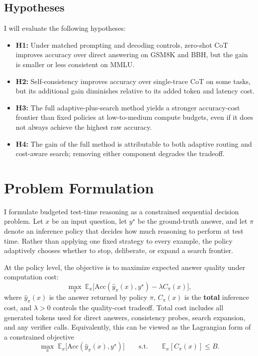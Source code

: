 \documentclass[10pt]{article}
\begin{document}
\subsection{Hypotheses}
I will evaluate the following hypotheses:
\begin{itemize}[leftmargin=1.2em,itemsep=0.10em]
    \item \textbf{H1:} Under matched prompting and decoding controls, zero-shot CoT improves accuracy over direct answering on GSM8K and BBH, but the gain is smaller or less consistent on MMLU.
    \item \textbf{H2:} Self-consistency improves accuracy over single-trace CoT on some tasks, but its additional gain diminishes relative to its added token and latency cost.
    \item \textbf{H3:} The full adaptive-plus-search method yields a stronger accuracy-cost frontier than fixed policies at low-to-medium compute budgets, even if it does not always achieve the highest raw accuracy.
    \item \textbf{H4:} The gain of the full method is attributable to both adaptive routing and cost-aware search; removing either component degrades the tradeoff.
\end{itemize}

\section{Problem Formulation}
I formulate budgeted test-time reasoning as a constrained sequential decision problem. Let $x$ be an input question, let $y^\star$ be the ground-truth answer, and let $\pi$ denote an inference policy that decides how much reasoning to perform at test time. Rather than applying one fixed strategy to every example, the policy adaptively chooses whether to stop, deliberate, or expand a search frontier.

At the policy level, the objective is to maximize expected answer quality under computation cost:
\[
\max_{\pi}\;
\mathbb{E}_{x}\Big[
\mathrm{Acc}(\hat y_\pi(x),y^\star)-\lambda C_\pi(x)
\Big],
\]
where $\hat y_\pi(x)$ is the answer returned by policy $\pi$, $C_\pi(x)$ is the \textbf{total} inference cost, and $\lambda>0$ controls the quality-cost tradeoff. Total cost includes all generated tokens used for direct answers, consistency probes, search expansion, and any verifier calls. Equivalently, this can be viewed as the Lagrangian form of a constrained objective
\[
\max_{\pi}\;\mathbb{E}_{x}\big[\mathrm{Acc}(\hat y_\pi(x),y^\star)\big]
\qquad
\text{s.t.}\qquad
\mathbb{E}_{x}[C_\pi(x)]\le B.
\]
\end{document}
